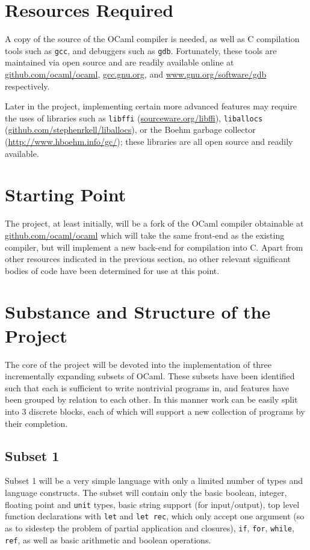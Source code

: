 \section*{Resources Required}

A copy of the source of the OCaml compiler is needed, as well as C compilation
tools such as \texttt{gcc}, and debuggers such as \texttt{gdb}. Fortunately,
these tools are maintained via open source and are readily available online at
\url{github.com/ocaml/ocaml}, \url{gcc.gnu.org}, and
\url{www.gnu.org/software/gdb} respectively.

Later in the project, implementing certain more advanced features may require
the uses of libraries such as \texttt{libffi} (\url{sourceware.org/libffi}),
\texttt{liballocs} (\url{github.com/stephenrkell/liballocs}), or the Boehm
garbage collector (\url{http://www.hboehm.info/gc/}); these libraries are all
open source and readily available.

\section*{Starting Point}

The project, at least initially, will be a fork of the OCaml compiler
obtainable at \url{github.com/ocaml/ocaml} which will take the same front-end
as the existing compiler, but will implement a new back-end for compilation
into C. Apart from other resources indicated in the previous section, no other
relevant significant bodies of code have been determined for use at this point.

\section*{Substance and Structure of the Project}

The core of the project will be devoted into the implementation of three
incrementally expanding subsets of OCaml. These subsets have been identified
such that each is sufficient to write nontrivial programs in, and features have
been grouped by relation to each other. In this manner work can be easily split
into 3 discrete blocks, each of which will support a new collection of
programs by their completion.

\subsection*{Subset 1}

Subset 1 will be a very simple language with only a limited number of types and
language constructs. The subset will contain only the basic boolean, integer,
floating point and \texttt{unit} types, basic string support (for
input/output), top level function declarations with \texttt{let} and
\texttt{let rec}, which only accept one argument (so as to sidestep the problem
of partial application and closures), \texttt{if}, \texttt{for},
\texttt{while}, \texttt{ref}, as well as basic arithmetic and boolean
operations.

